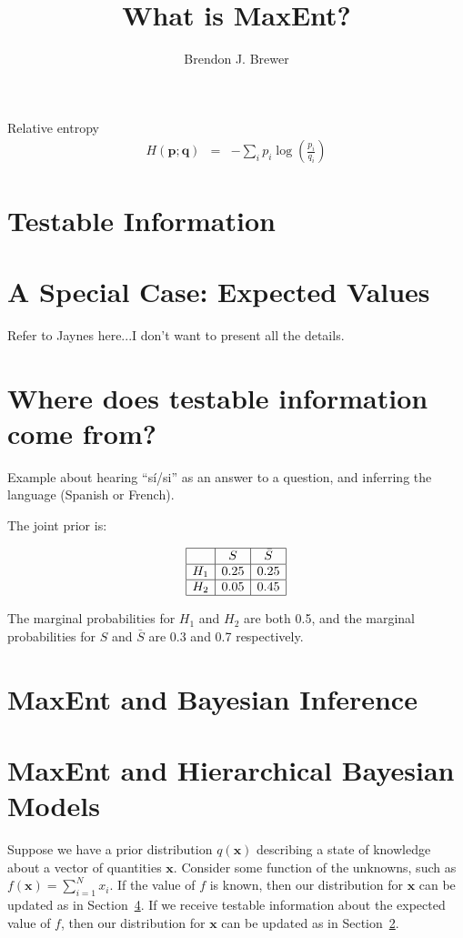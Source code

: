 \documentclass[letterpaper, 11pt]{article}
\title{What is MaxEnt?}
\author{Brendon J. Brewer}
\begin{document}
\maketitle



Relative entropy
\begin{eqnarray}
H(\mathbf{p}; \mathbf{q}) &=& -\sum_i p_i \log\left(\frac{p_i}{q_i}\right) 
\end{eqnarray}

\section{Testable Information}

\section{A Special Case: Expected Values}\label{sec:expectations}
Refer to Jaynes here...I don't want to present all the details.

\section{Where does testable information come from?}

Example about hearing ``sí/si'' as an answer to a question,
and inferring the language (Spanish or French).

The joint prior is:

\begin{eqnarray}
\begin{array}{|c|c|c|}
\hline
	&	S	& \bar{S}\\
\hline
H_1 & 0.25  & 0.25\\
\hline
H_2 & 0.05 & 0.45\\
\hline
\end{array}
\end{eqnarray}

The marginal probabilities for $H_1$ and $H_2$ are both 0.5, and the
marginal probabilities for $S$ and $\bar{S}$ are 0.3 and 0.7 respectively.


\section{MaxEnt and Bayesian Inference}\label{sec:bayes}

\section{MaxEnt and Hierarchical Bayesian Models}
Suppose we have a prior distribution $q(\mathbf{x})$ describing a state of
knowledge about a vector of quantities $\mathbf{x}$. Consider some
function of the unknowns, such as $f(\mathbf{x}) = \sum_{i=1}^N x_i$.
If the value of $f$ is known, then our distribution for $\mathbf{x}$ can
be updated as in Section~\ref{sec:bayes}. If we receive testable information
about the expected value of $f$, then our distribution for $\mathbf{x}$ can
be updated as in Section~\ref{sec:expectations}.
\end{document}

